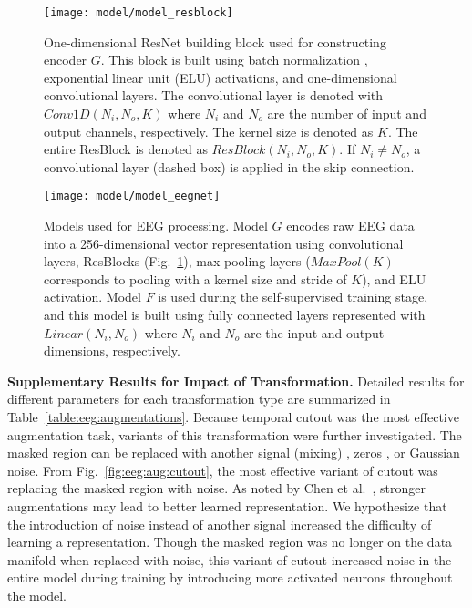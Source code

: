 \documentclass{article}
\renewcommand{\paragraph}[1]{\textbf{#1}\hspace{1em}}
\begin{document}
\begin{figure}[H]
  \centering
  \texttt{[image: model/model\_resblock]}
  \caption{One-dimensional ResNet \cite{he_identity_2016} building block used
  for constructing encoder $G$. This block is built using batch normalization
  \cite{ioffe_batch_2015}, exponential linear unit (ELU) activations, and
  one-dimensional convolutional layers. The convolutional layer is denoted with
  $Conv1D(N_i, N_o, K)$ where $N_i$ and $N_o$ are the number of input and output
  channels, respectively. The kernel size is denoted as $K$. The entire ResBlock
  is denoted as $ResBlock(N_i, N_o, K)$. If $N_i \neq N_o$, a convolutional
  layer (dashed box) is applied in the skip connection.}
  \label{fig:model:resblock}
\end{figure}

\begin{figure}[H]
  \centering
  \texttt{[image: model/model\_eegnet]}
  \caption{Models used for EEG processing. Model $G$ encodes raw EEG data into a
  256-dimensional vector representation using convolutional layers, ResBlocks
  (Fig.~\ref{fig:model:resblock}), max pooling layers ($MaxPool(K)$ corresponds
  to pooling with a kernel size and stride of $K$), and ELU activation. Model
  $F$ is used during the self-supervised training stage, and this model is built
  using fully connected layers represented with $Linear(N_i, N_o)$ where $N_i$
  and $N_o$ are the input and output dimensions, respectively.}
  \label{fig:model:eeg}
\end{figure}


\paragraph{Supplementary Results for Impact of Transformation.}
Detailed results for different parameters for each transformation type are
summarized in Table~\ref{table:eeg:augmentations}. Because temporal cutout was
the most effective augmentation task, variants of this transformation were
further investigated. The masked region can be replaced with another signal
(mixing) \cite{yun_cutmix_2019}, zeros \cite{devries_improved_2017}, or Gaussian
noise. From Fig.~\ref{fig:eeg:aug:cutout}, the most effective variant of cutout
was replacing the masked region with noise.  As noted by Chen et
al.~\cite{chen_simple_2020}, stronger augmentations may lead to better learned
representation. We hypothesize that the introduction of noise instead of another
signal increased the difficulty of learning a representation. Though the masked
region was no longer on the data manifold when replaced with noise, this variant
of cutout increased noise in the entire model during training by introducing
more activated neurons throughout the model.
\end{document}
